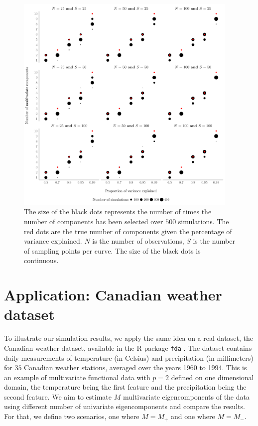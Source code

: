 \begin{figure}
     \centering
    \includegraphics[width=0.95\textwidth]{figures/npc_estim.pdf}
    \caption{The size of the black dots represents the number of times the number of components has been selected over $500$ simulations. The red dots are the true number of components given the percentage of variance explained. $N$ is the number of observations, $S$ is the number of sampling points per curve. The size of the black dots is continuous.}
    \label{fig:npc_estim}
\end{figure}


\section{Application: Canadian weather dataset} %
\label{sec:application_canadian_weather_dataset}

To illustrate our simulation results, we apply the same idea on a real dataset, the Canadian weather dataset, available in the \textsf{R} package \texttt{fda} \citep{ramsayFdaFunctionalData2023}. The dataset contains daily measurements of temperature (in Celsius) and precipitation (in millimeters) for $35$ Canadian weather stations, averaged over the years 1960 to 1994. This is an example of multivariate functional data with $p = 2$ defined on one dimensional domain, the temperature being the first feature and the precipitation being the second feature. We aim to estimate $M$ multivariate eigencomponents of the data using different number of univariate eigencomponents and compare the results. For that, we define two scenarios, one where $M = M_{+}$ and one where $M = M_{-}$.

